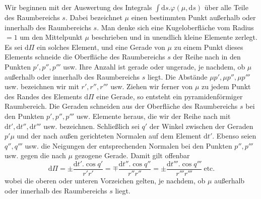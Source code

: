 Wir beginnen mit der Auswertung des Integrals $\int\mathrm{d}s.\varphi(\mu,\mathrm{d}s)$ über alle Teile des Raumbereichs $s$. Dabei bezeichnet $\mu$ einen bestimmten Punkt außerhalb oder innerhalb des Raumbereichs $s$. Man denke sich eine Kugeloberfläche vom Radius $=1$ um den Mittelpunkt $\mu$ beschrieben und in unendlich kleine Elemente zerlegt. Es sei $\mathrm{d}\Pi$ ein solches Element, und eine Gerade von $\mu$ zu einem Punkt dieses Elements schneide die Oberfläche des Raumbereichs $s$ der Reihe nach in den Punkten $p',p'',p'''$ usw. Ihre Anzahl ist gerade oder ungerade, je nachdem, ob $\mu$ außerhalb oder innerhalb des Raumbereichs $s$ liegt. Die Abstände $\mu p',\mu p'',\mu p'''$ usw. bezeichnen wir mit $r',r'',r'''$ usw. Ziehen wir ferner von $\mu$ zu jedem Punkt des Randes des Elements $\mathrm{d}\Pi$ eine Gerade, so entsteht ein pyramidenförmiger Raumbereich. Die Geraden schneiden aus der Oberfläche des Raumbereichs $s$ bei den Punkten $p',p'',p'''$ usw. Elemente heraus, die wir der Reihe nach mit $\mathrm{d}t',\mathrm{d}t'',\mathrm{d}t'''$ usw. bezeichnen. Schließlich sei $q'$ der Winkel zwischen der Geraden $p'\mu$ und der nach außen gerichteten Normalen auf dem Element $\mathrm{d}t'$. Ebenso seien $q'',q'''$ usw. die Neigungen der entsprechenden Normalen bei den Punkten $p'',p'''$ usw. gegen die nach $\mu$ gezogene Gerade. Damit gilt offenbar
\[
\mathrm{d}\Pi=\pm\frac{\mathrm{d}t'.\cos q'}{r'r'}=\mp\frac{\mathrm{d}t''.\cos q''}{r''r''}=\pm\frac{\mathrm{d}t'''.\cos q'''}{r'''r'''}\ \text{etc.}
\]
wobei die oberen oder unteren Vorzeichen gelten, je nachdem, ob $\mu$ außerhalb oder innerhalb des Raumbereichs $s$ liegt.

